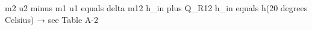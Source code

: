 m2 u2 minus m1 u1 equals delta m12 h_in plus Q_R12  
h_in equals h(20 degrees Celsius) → see Table A-2